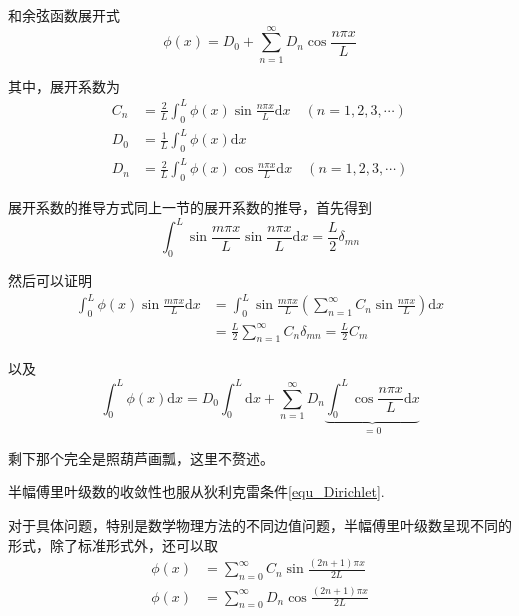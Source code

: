 \documentclass[UTF8,12pt]{ctexart}
\begin{document}
\noindent 和余弦函数展开式
\begin{equation}
\phi(x)=D_{0}+\sum_{n=1}^{\infty} D_{n} \cos \frac{n \pi x}{L}
\end{equation}

\noindent 其中，展开系数为
\begin{equation}
	\begin{aligned}
	C_{n}&=\frac{2}{L} \int_{0}^{L} \phi(x) \sin \frac{n \pi x}{L} \mathrm{d} x \quad(n=1,2,3, \cdots)\\
	D_{0}&=\frac{1}{L} \int_{0}^{L} \phi(x) \mathrm{d} x\\
	D_{n}&=\frac{2}{L} \int_{0}^{L} \phi(x) \cos \frac{n \pi x}{L} \mathrm{d} x \quad(n=1,2,3, \cdots)
	\end{aligned}
\end{equation}

	展开系数的推导方式同上一节的展开系数的推导，首先得到
	\begin{equation}
	\int_{0}^{L} \sin \frac{m \pi x}{L} \sin \frac{n \pi x}{L} \mathrm{d} x=\frac{L}{2} \delta_{m n}
	\end{equation}
	
\noindent 然后可以证明
\begin{equation}
\begin{aligned}
\int_{0}^{L} \phi(x) \sin \frac{m \pi x}{L} \mathrm{d} x&=\int_{0}^{L} \sin \frac{m \pi x}{L}\left(\sum_{n=1}^{\infty} C_{n} \sin \frac{n \pi x}{L}\right) \mathrm{d} x\\
&=\frac{L}{2} \sum_{n=1}^{\infty} C_{n} \delta_{m n}=\frac{L}{2} C_{m}
\end{aligned}
\end{equation}

\noindent 以及
\begin{equation}
\int_{0}^{L} \phi(x) \mathrm{d} x=D_{0} \int_{0}^{L} \mathrm{d} x+\sum_{n=1}^{\infty} D_{n} \underbrace{\int_{0}^{L} \cos \frac{n \pi x}{L} \mathrm{d} x}_{=0}
\end{equation}

\noindent 剩下那个完全是照葫芦画瓢，这里不赘述。

	半幅傅里叶级数的收敛性也服从狄利克雷条件\autoref{equ_Dirichlet}.
	
	对于具体问题，特别是数学物理方法的不同边值问题，半幅傅里叶级数呈现不同的形式，除了标准形式外，还可以取
	\begin{equation}
	\begin{aligned}
	\phi(x)&=\sum_{n=0}^{\infty} C_{n} \sin \frac{(2 n+1) \pi x}{2 L}\\
	\phi(x)&=\sum_{n=0}^{\infty} D_{n} \cos \frac{(2 n+1) \pi x}{2 L}
	\end{aligned}
	\end{equation}
	
\end{document}
